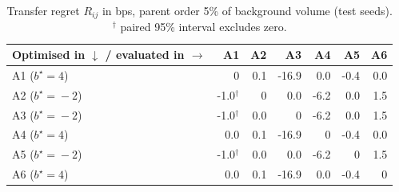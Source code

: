 \begin{table}[H]
\centering\footnotesize
\caption{Transfer regret $R_{ij}$ in bps, parent order 5\% of background volume (test seeds). $^\dagger$ paired 95\% interval excludes zero.}\label{tab:regret5}
\begin{tabular}{lrrrrrr}
\toprule
Optimised in $\downarrow$ / evaluated in $\rightarrow$ & A1 & A2 & A3 & A4 & A5 & A6 \\
\midrule
A1 ($b^\star\!=\!4$) & 0 & 0.1 & -16.9 & 0.0 & -0.4 & 0.0 \\
A2 ($b^\star\!=\!-2$) & -1.0$^\dagger$ & 0 & 0.0 & -6.2 & 0.0 & 1.5 \\
A3 ($b^\star\!=\!-2$) & -1.0$^\dagger$ & 0.0 & 0 & -6.2 & 0.0 & 1.5 \\
A4 ($b^\star\!=\!4$) & 0.0 & 0.1 & -16.9 & 0 & -0.4 & 0.0 \\
A5 ($b^\star\!=\!-2$) & -1.0$^\dagger$ & 0.0 & 0.0 & -6.2 & 0 & 1.5 \\
A6 ($b^\star\!=\!4$) & 0.0 & 0.1 & -16.9 & 0.0 & -0.4 & 0 \\
\bottomrule
\end{tabular}
\end{table}
